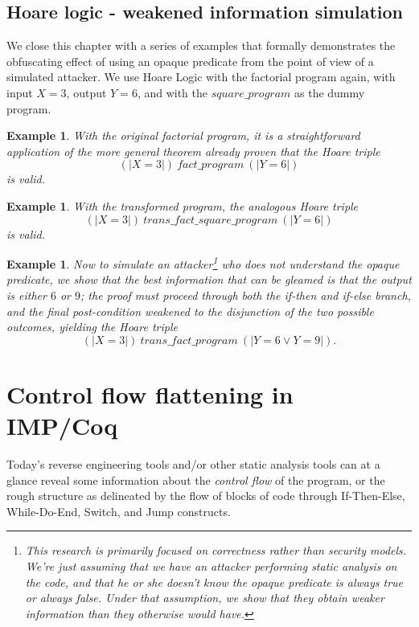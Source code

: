 \documentclass[compsoc,conference,a4paper,10pt,times]{IEEEtran}
\newtheorem{example}[theorem]{Example}
\begin{document}
\subsection{Hoare logic - weakened information simulation}\label{weakened}

We close this chapter with a series of examples that formally demonstrates the obfuscating effect of using an opaque predicate from the point of view of a simulated attacker.  We use Hoare Logic with the factorial program again, with input $X=3$, output $Y=6$, and with the $square\_program$ as the dummy program.

\begin{example}\label{hoare21}
    With the original factorial program, it is a straightforward application of the more general theorem already proven that the Hoare triple \[(|X=3|)\ fact\_program\ (|Y=6|)\] is valid.
\end{example}

\begin{example}\label{hoare22}
With the transformed program, the analogous Hoare triple
\[(|X=3|)\ trans\_fact\_square\_program\ (|Y=6|)\]
is valid.
\end{example}

\begin{example}\label{hoare23}
Now to simulate an attacker\footnote{This research is primarily focused on correctness rather than security models.  We're just assuming that we have an attacker performing static analysis on the code, and that he or she doesn't know the opaque predicate is always true or always false.  Under that assumption, we show that they obtain weaker information than they otherwise would have.} who does not understand the opaque predicate, we show that the best information that can be gleamed is that the output is either $6$ or $9$; the proof must proceed through both the if-then and if-else branch, and the final post-condition weakened to the disjunction of the two possible outcomes, yielding the Hoare triple
\[
(|X=3|)\ trans\_fact\_program\ (|Y=6 \lor Y=9|).
\]
\end{example}

\section{Control flow flattening in IMP/Coq}\label{Ch4}
Today's reverse engineering tools and/or other static analysis tools can at a glance reveal some information about the \emph{control flow} of the program, or the rough structure as delineated by the flow of blocks of code through If-Then-Else, While-Do-End, Switch, and Jump constructs. 
\end{document}
